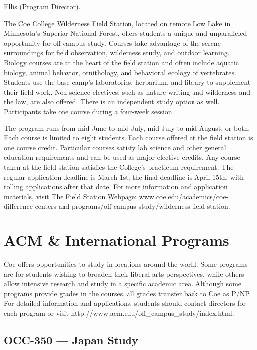 \documentclass[
  letterpaper,
]{scrbook}
\begin{document}
Ellis (Program Director).

The Coe College Wilderness Field Station, located on remote Low Lake in
Minnesota's Superior National Forest, offers students a unique and
unparalleled opportunity for off-campus study. Courses take advantage of
the serene surroundings for field observation, wilderness study, and
outdoor learning. Biology courses are at the heart of the field station
and often include aquatic biology, animal behavior, ornithology, and
behavioral ecology of vertebrates. Students use the base camp's
laboratories, herbarium, and library to supplement their field work.
Non-science electives, such as nature writing and wilderness and the
law, are also offered. There is an independent study option as well.
Participants take one course during a four-week session.

The program runs from mid-June to mid-July, mid-July to mid-August, or
both. Each course is limited to eight students. Each course offered at
the field station is one course credit. Particular courses satisfy lab
science and other general education requirements and can be used as
major elective credits. Any course taken at the field station satisfies
the College's practicum requirement. The regular application deadline is
March 1st; the final deadline is April 15th, with rolling applications
after that date. For more information and application materials, visit
The Field Station Webpage:
www.coe.edu/academics/coe-difference-centers-and-programs/off-campus-study/wilderness-field-station.

\section{ACM \& International
Programs}\label{acm-international-programs}

Coe offers opportunities to study in locations around the world. Some
programs are for students wishing to broaden their liberal arts
perspectives, while others allow intensive research and study in a
specific academic area. Although some programs provide grades in the
courses, all grades transfer back to Coe as P/NP. For detailed
information and applications, students should contact directors for each
program or visit http://www.acm.edu/off\_campus\_study/index.html.

\subsection{OCC-350 --- Japan Study}\label{occ-350-japan-study}
\end{document}
